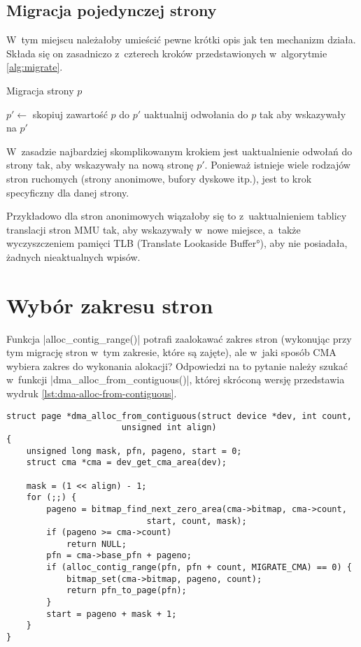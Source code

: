 \subsection{Migracja pojedynczej strony}

 W~tym miejscu należałoby umieścić pewne
krótki opis jak ten mechanizm działa.  Składa się on zasadniczo
z~czterech kroków przedstawionych w~algorytmie \ref{alg:migrate}.

\begin{algorithm}\label{alg:migrate}
\caption{Migracja strony $p$}
\begin{algorithmic}[1]
    \State $p' \gets$ 
    \State skopiuj zawartość $p$ do $p'$
    \State uaktualnij odwołania do $p$ tak aby wskazywały na $p'$
    \State {}
\EndProcedure
\end{algorithmic}
\end{algorithm}

 W~zasadzie najbardziej skomplikowanym krokiem
jest uaktualnienie odwołań do strony tak, aby wskazywały na nową
stronę $p'$.  Ponieważ istnieje wiele rodzajów stron ruchomych (strony
anonimowe, bufory dyskowe itp.), jest to krok specyficzny dla danej
strony.

Przykładowo dla stron anonimowych wiązałoby się to z~uaktualnieniem
tablicy translacji stron MMU tak, aby wskazywały w~nowe miejsce,
a~także wyczyszczeniem pamięci TLB (\ang{Translate Lookaside Buffer}),
aby nie posiadała, żadnych nieaktualnych wpisów.


\section{Wybór zakresu stron}

Funkcja \code|alloc_contig_range()| potrafi zaalokawać zakres
stron (wykonując przy tym migrację stron w~tym zakresie, które są
zajęte), ale w~jaki sposób CMA wybiera zakres do wykonania alokacji?
Odpowiedzi na to pytanie należy szukać w~funkcji
\code|dma_alloc_from_contiguous()|, której skróconą wersję
przedstawia wydruk \ref{lst:dma-alloc-from-contiguous}.

\begin{lstlisting}[float=tbhp,caption={Skrócony wydruk funkcji
    \code|dma_alloc_from_contiguous()| z Linuksa
    3.5.},label=lst:dma-alloc-from-contiguous]
struct page *dma_alloc_from_contiguous(struct device *dev, int count,
				       unsigned int align)
{
	unsigned long mask, pfn, pageno, start = 0;
	struct cma *cma = dev_get_cma_area(dev);

	mask = (1 << align) - 1;
	for (;;) {
		pageno = bitmap_find_next_zero_area(cma->bitmap, cma->count,
						    start, count, mask);
		if (pageno >= cma->count)
			return NULL;
		pfn = cma->base_pfn + pageno;
		if (alloc_contig_range(pfn, pfn + count, MIGRATE_CMA) == 0) {
			bitmap_set(cma->bitmap, pageno, count);
			return pfn_to_page(pfn);
		}
		start = pageno + mask + 1;
	}
}
\end{lstlisting}

